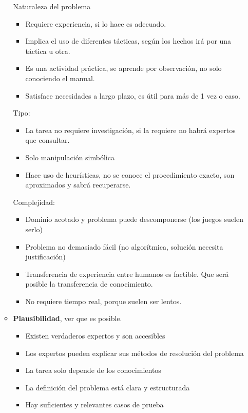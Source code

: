 \documentclass[12pt, twoside, openright]{report} %
\begin{document}
\begin{enumerate}
\begin{itemize}
		            Naturaleza del problema
		            \begin{itemize}
			            \item Requiere experiencia, si lo hace es adecuado.
			            \item Implica el uso de diferentes tácticas, según los hechos irá por una táctica u otra.
			            \item Es una actividad práctica, se aprende por observación, no solo conociendo el manual.
			            \item Satisface necesidades a largo plazo, es útil para más de 1 vez o caso.
		            \end{itemize}
		            Tipo:
		            \begin{itemize}
			            \item La tarea no requiere investigación, si la requiere no habrá expertos que consultar.
			            \item Solo manipulación simbólica
			            \item Hace uso de heurísticas, no se conoce el procedimiento exacto, son aproximados y sabrá recuperarse.
		            \end{itemize}
		            Complejidad:
		            \begin{itemize}
			            \item Dominio acotado y problema puede descomponerse (los juegos suelen serlo)
			            \item Problema no demasiado fácil (no algorítmica, solución necesita justificación)
			            \item Transferencia de experiencia entre humanos es factible. Que será posible la transferencia de conocimiento.
			            \item No requiere tiempo real, porque suelen ser lentos.
		            \end{itemize}
		      \item \textbf{Plausibilidad}, ver que es posible.
		            \begin{itemize}
			            \item Existen verdaderos expertos y son accesibles
			            \item Los expertos pueden explicar sus métodos de resolución del problema
			            \item La tarea solo depende de los conocimientos
			            \item La definición del problema está clara y estructurada
			            \item Hay suficientes y relevantes casos de prueba

\end{itemize}
\end{itemize}
\end{enumerate}
\end{document}
